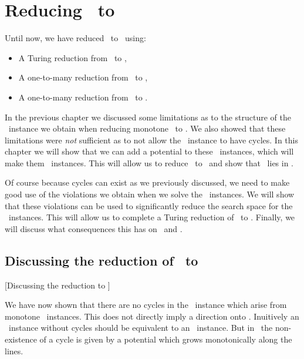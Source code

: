 \setchapterpreamble[u]{\margintoc}
\chapter{Reducing \Tarski\ to \EOPL}\label{ch:eopl_reduction}

Until now, we have reduced \Tarski\ to \EndOfLine\ using:
\begin{itemize}
	\item A Turing reduction from \Tarski\ to \Tarskistar,
	\item A one-to-many reduction from \Tarskistar\ to \Sperner,
	\item A one-to-many reduction from \Sperner\ to \EndOfLine.
\end{itemize}
In the previous chapter we discussed some limitations as to the structure of the \Sperner\ instance we obtain when reducing monotone \Tarskistar\ to \Sperner. We also showed that these limitations were \emph{not} sufficient as to not allow the \EndOfLine\ instance to have cycles. In this chapter we will show that we can add a potential to these \EndOfLine\ instances, which will make them \EndOfPotentialLine\ instances. This will allow us to reduce \Tarski\ to \EndOfPotentialLine\ and show that \Tarski\ lies in \EOPL\@.

Of course because cycles can exist as we previously discussed, we need to make good use of the violations we obtain when we solve the \EndOfPotentialLine\ instances. We will show that these violations can be used to significantly reduce the search space for the \Tarskistar\ instances. This will allow us to complete a Turing reduction of \Tarskistar\ to \EndOfPotentialLine\@. Finally, we will discuss what consequences this has on \UniqueTarski\ and \SuperUniqueTarski\@.

\section{Discussing the reduction of \Tarskistar\ to \EndOfPotentialLine}[Discussing the reduction to \EOPL]

We have now shown that there are no cycles in the \EndOfLine\ instance which arise from monotone \Tarskistar\ instances. This does not directly imply a direction onto \EndOfPotentialLine. Inuitively an \EndOfLine\ instance without cycles should be equivalent to an \EndOfPotentialLine\ instance. But in \EndOfPotentialLine\ the non-existence of a cycle is given by a potential which grows monotonically along the lines.

